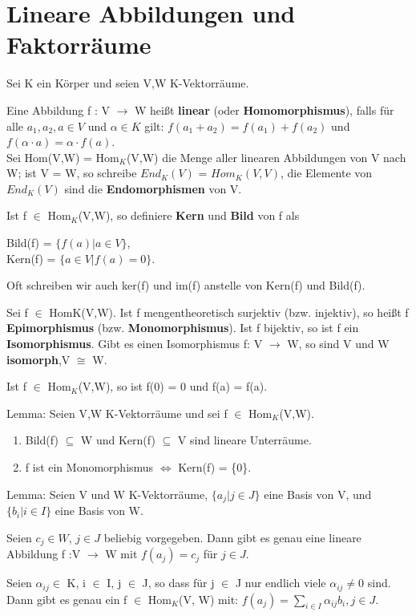 \section{Lineare Abbildungen und Faktorräume}
\begin{definition}
Sei K ein Körper und seien V,W K-Vektorräume.
\begin{compactenum}
\item Eine Abbildung f : V $\to$ W heißt \textbf{linear} (oder \textbf{Homomorphismus}), falls für alle $a_1, a_2, a \in V$ und $\alpha \in K$ gilt:
$f (a_1 + a_2) = f (a_1) + f (a_2)$ und $f (\alpha \cdot a) = \alpha \cdot f (a)$.\\
Sei Hom(V,W) = Hom$_K$(V,W) die Menge aller linearen Abbildungen von V nach W; ist V = W, so schreibe $End_K(V )$ = $Hom_K(V,V)$, die Elemente von $End_K(V)$ sind die \textbf{Endomorphismen} von V.
\item Ist f $\in$ Hom$_K$(V,W), so definiere \textbf{Kern} und \textbf{Bild} von f als
\begin{center}
Bild(f) = $\{ f (a) | a \in V\}$,\\
Kern(f) = $\{ a \in V | f(a) = 0\}$.
\end{center}
Oft schreiben wir auch ker(f) und im(f) anstelle von Kern(f) und Bild(f).
\item Sei f $\in$ HomK(V,W). Ist f mengentheoretisch surjektiv (bzw. injektiv), so heißt f \textbf{Epimorphismus} (bzw. \textbf{Monomorphismus}). Ist f bijektiv, so ist f ein \textbf{Isomorphismus}. Gibt es einen Isomorphismus f: V $\to$ W, so sind V und W \textbf{isomorph},V $\cong$ W.
\end{compactenum}
Ist f $\in$ Hom$_K$(V,W), so ist f(0) = 0 und f(a) = f(a).
\end{definition}

Lemma: Seien V,W K-Vektorräume und sei f $\in$ Hom$_K$(V,W).
\begin{enumerate}
\item Bild(f) $\subseteq$ W und Kern(f) $\subseteq$ V sind lineare Unterräume.
\item f ist ein Monomorphismus $\Leftrightarrow$ Kern(f) = \{0\}.
\end{enumerate}

Lemma: Seien V und W K-Vektorräume, $\{a_j | j \in J\}$ eine Basis von V, und $\{b_i | i \in I\}$ eine Basis von W.
\begin{compactenum}
\item Seien $c_j \in W$, $j \in J$ beliebig vorgegeben. Dann gibt es genau eine lineare Abbildung f :V $\to$ W mit $f(a_j)=c_j$ für $j \in J$.
\item Seien $\alpha_{ij} \in$ K, i $\in$ I, j $\in$ J, so dass für j $\in$ J nur endlich viele $\alpha_{ij} \neq 0$ sind. Dann gibt es genau ein f $\in$ Hom$_K$(V, W) mit: $f(a_j) = \sum\nolimits_{i \in I} \alpha_{ij} b_i, j \in J$.
\end{compactenum}


